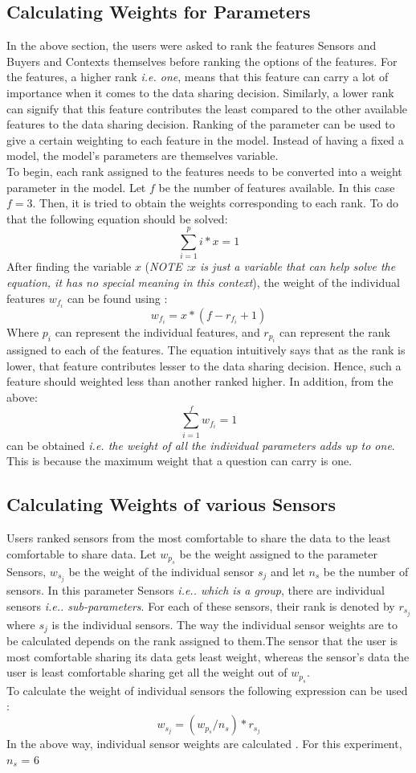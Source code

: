 \subsection{Calculating Weights for Parameters}
In the above section, the users were asked to rank the features Sensors and Buyers and Contexts themselves before ranking the options of the features. For the features, a higher rank {\it i.e. one}, means that this feature can carry a lot of
importance when it comes to the data sharing decision. Similarly, a lower rank can signify that this feature contributes the least compared to the other available features to the data sharing decision. 
Ranking of the parameter can be used to give a certain weighting to each feature in the model. Instead of having a fixed a model, the model's parameters are themselves variable.\\
To begin, each rank assigned to the features needs to be converted into a weight parameter in the model. Let $f$ be the number of features available. In this case $f=3$. Then, it is tried to obtain the 
weights corresponding to each rank. To do that the following equation should be solved:
$$\sum^{p}_{i=1} i*x = 1$$
After finding the variable $x$ ({\it NOTE :$x$ is just a variable that can help solve the equation, it has no special meaning in this context}), the weight of the individual features $w_{f_{i}}$ can be found using :
$$w_{f_{i}} = x* (f - r_{f_{i}} + 1)$$
Where $p_{i}$ can represent the individual features, and $r_{p_{i}}$ can represent the rank assigned to each of the features. The equation intuitively says that
as the rank is lower, that feature contributes lesser to the data sharing decision. Hence, such a feature should weighted less than another ranked higher.
In addition, from the above: $$\sum^{f}_{i=1} w_{f_{i}} = 1$$ can be obtained {\it i.e. the weight of all the individual parameters adds up to one}. This is because
the maximum weight that a question can carry is one.

\subsection{Calculating Weights of various Sensors}
Users ranked sensors from the most comfortable to share the data to the least comfortable to share data.
Let $w_{p_{s}}$ be the weight assigned to the parameter Sensors, $w_{s_{j}}$ be the weight of the individual sensor $s_j$ and let $n_s$ be the number of sensors. In this parameter Sensors  {\it i.e.. which is a group}, there are individual sensors {\it i.e.. sub-parameters}.
For each of these sensors, their rank is denoted by $r_{s_{j}}$ where $s_j$ is the individual sensors. The way the individual sensor weights are to be 
calculated depends on the rank assigned to them.The sensor that the user is most comfortable sharing its data gets least weight, whereas the sensor's
data the user is least comfortable sharing get all the weight out of $w_{p_{s}}$.\\
To calculate the weight of individual sensors the following expression can be used :
$$w_{s_{j}} = (w_{p_{s}}/n_s)*r_{s_{j}}$$
In the above way, individual sensor weights are calculated . For this experiment, $n_s$ = 6


